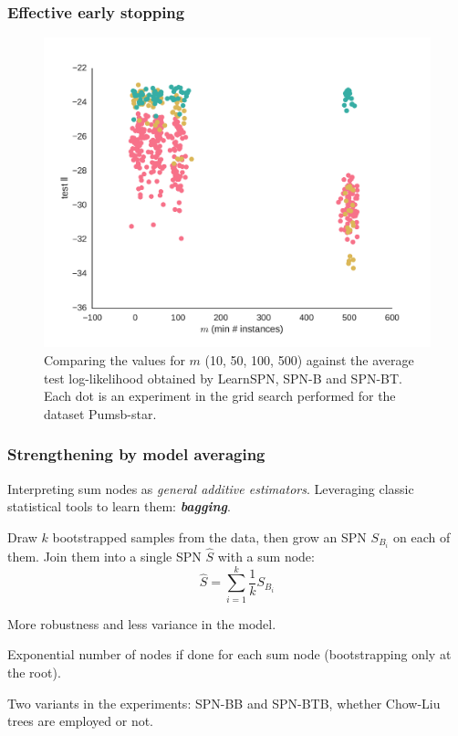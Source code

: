 \documentclass[xcolor={usenames,dvipsnames,svgnames}, compress]{beamer}
\begin{document}
\begin{frame}
  \frametitle{Effective early stopping}
  \begin{figure}[htbp]
    \begin{center}
      \includegraphics[width=0.7\linewidth]{figures/ll-m/10-8/pumsb-star-ll-m}
      \caption{Comparing the values for $m$ (10, 50, 100, 500) against
        the average test log-likelihood obtained by \textsf{LearnSPN},
        \textsf{SPN-B} and \textsf{SPN-BT}. Each dot is an experiment
        in the grid search performed for the dataset Pumsb-star.}
    \end{center}
  \end{figure}

\end{frame}

\begin{frame}
  \frametitle{Strengthening by model averaging}
  \footnotesize
  Interpreting sum nodes as \emph{general additive estimators}. Leveraging
  classic statistical tools to learn them:
  \textbf{\emph{bagging}}.\par\bigskip

  Draw $k$ bootstrapped samples from the data, then grow an SPN $S_{B_i}$ on
  each of them. Join them into a single SPN $\hat{S}$ with a sum node:
  $$\hat{S}=\sum_{i=1}^{k}\frac{1}{k}S_{B_{i}}$$

  More robustness and less variance in the model.\par\bigskip

  Exponential number of nodes if done for each sum node (bootstrapping
  only at the root).\par\bigskip

  Two variants in the experiments: \textsf{SPN-BB} and
  \textsf{SPN-BTB}, whether Chow-Liu trees are employed or not.
\end{frame}
\end{document}

